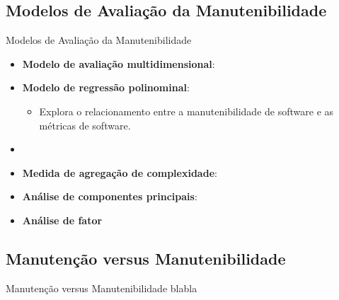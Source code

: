 \subsection{Modelos de Avaliação da Manutenibilidade}
\begin{frame}{Modelos de Avaliação da Manutenibilidade}
   \begin{itemize}
    \item \textbf{Modelo de avaliação multidimensional}:   
    \item \textbf{Modelo de regressão polinominal}: 
    \begin{itemize}
      \item Explora o relacionamento entre a manutenibilidade de software e as métricas de software. 
    \end{itemize}   
    \item \item \textbf{Medida de agregação de complexidade}:
    \item \textbf{Análise de componentes principais}:
    \item \textbf{Análise de fator}
   \end{itemize}
\end{frame}

\subsection{Manutenção versus Manutenibilidade}
\begin{frame}[t, fragile]{Manutenção versus Manutenibilidade}
    blabla
\end{frame}


